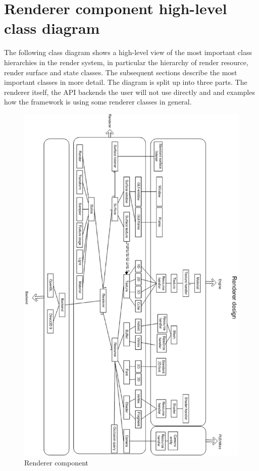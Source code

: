 \section{Renderer component high-level class diagram}
The following class diagram shows a high-level view of the most important class hierarchies in the render system, in particular the hierarchy of render resource, render surface and state classes. The subsequent sections describe the most important classes in more detail. The diagram is split up into three parts. The renderer itself, the API backends the user will not use directly and and examples how the framework is using some renderer classes in general.

\begin{figure}
  \centering
  \includegraphics[scale=0.7]{pics/PLRendererClassDiagram.eps}
  \caption{Renderer component}
  \label{fig:Renderer component high-level class diagram}
\end{figure}




